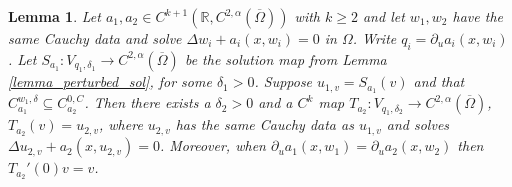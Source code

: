 \documentclass[11pt,a4paper]{amsart}
\newtheorem{Lemma}[Theorem]{Lemma}
\theoremstyle{definition}
\numberwithin{equation}{section}
\newcommand{\mR}{\mathbb{R}}                    %
\newcommand{\ol}[1]{\overline{#1}}
\newcommand{\p}{\partial}
\newcommand{\Om}{\Omega}
\begin{document}
\begin{Lemma}\label{lemma:smooth_solution_operator}
Let $a_1,a_2\in C^{k+1}(\mR, C^{2,\alpha}(\ol{\Om}))$ with $k\geq 2$ and let $w_1,w_2$ have the same Cauchy data and solve $\Delta w_i + a_i(x,w_i) = 0$ in $\Omega$.
Write $q_i = \p_u a_i(x,w_i)$. Let $S_{a_1}\colon V_{q_1,\delta_1}\to C^{2,\alpha}(\ol{\Om})$ be the solution map from Lemma \ref{lemma_perturbed_sol}, for some $\delta_1>0$.
Suppose $u_{1,v} = S_{a_1}(v)$ and that $C_{a_1}^{w_1,\delta} \subseteq C_{a_2}^{0,C}$.
Then there exists a $\delta_2 > 0$ and a $C^k$ map $T_{a_2}\colon V_{q_1,\delta_2}\to C^{2,\alpha}(\ol{\Om})$, $T_{a_2}(v) = u_{2,v}$, where $u_{2,v}$ has the same Cauchy data as $u_{1,v}$ and solves $\Delta u_{2,v} + a_2(x,u_{2,v}) = 0$.
Moreover, when \( \partial_{u}a_{1}(x,w_{1}) = \partial_{u}a_{2}(x,w_{2}) \) then $T_{a_2}'(0)v = v$.
\end{Lemma}
\end{document}
